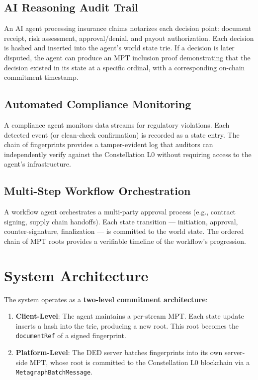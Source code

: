 \documentclass[11pt,a4paper]{article}
\begin{document}
\subsection{AI Reasoning Audit Trail}

An AI agent processing insurance claims notarizes each decision point: document receipt,
risk assessment, approval/denial, and payout authorization. Each decision is hashed and
inserted into the agent's world state trie. If a decision is later disputed, the agent can
produce an MPT inclusion proof demonstrating that the decision existed in its state at a
specific ordinal, with a corresponding on-chain commitment timestamp.

\subsection{Automated Compliance Monitoring}

A compliance agent monitors data streams for regulatory violations. Each detected event
(or clean-check confirmation) is recorded as a state entry. The chain of fingerprints
provides a tamper-evident log that auditors can independently verify against the
Constellation L0 without requiring access to the agent's infrastructure.

\subsection{Multi-Step Workflow Orchestration}

A workflow agent orchestrates a multi-party approval process (e.g., contract signing,
supply chain handoffs). Each state transition --- initiation, approval, counter-signature,
finalization --- is committed to the world state. The ordered chain of MPT roots provides a
verifiable timeline of the workflow's progression.

\section{System Architecture}

The system operates as a \textbf{two-level commitment architecture}:

\begin{enumerate}
  \item \textbf{Client-Level}: The agent maintains a per-stream MPT. Each state update
    inserts a hash into the trie, producing a new root. This root becomes the
    \texttt{documentRef} of a signed fingerprint.
  \item \textbf{Platform-Level}: The DED server batches fingerprints into its own
    server-side MPT, whose root is committed to the Constellation L0 blockchain via a
    \texttt{MetagraphBatchMessage}.
\end{enumerate}
\end{document}
